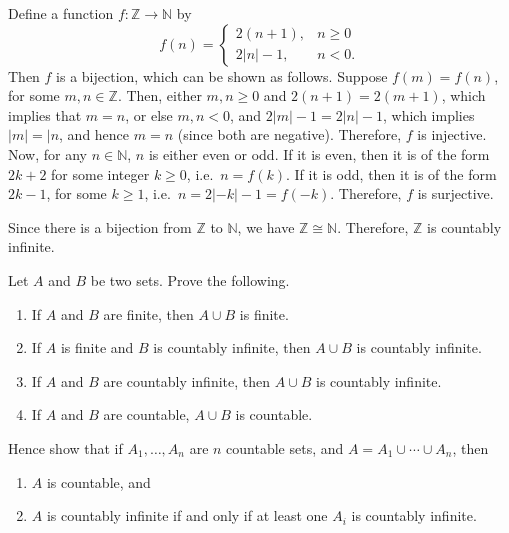 \begin{Solution*}
Define a function $f \colon \mathbb Z \to \mathbb N$ by
\begin{equation*}
f(n) = \begin{cases}
2(n + 1), & n \ge 0 \\
2|n| - 1, & n < 0.
\end{cases}
\end{equation*}
Then $f$ is a bijection, which can be shown as follows. Suppose $f(m) = f(n)$, for some $m, n \in \mathbb Z$. Then, either $m, n \ge 0$ and $2(n + 1) = 2(m + 1)$, which implies that $m = n$, or else $m, n < 0$, and $2|m| - 1 = 2|n| - 1$, which implies $|m| = |n$, and hence $m = n$ (since both are negative). Therefore, $f$ is injective. Now, for any $n \in \mathbb N$, $n$ is either even or odd. If it is even, then it is of the form $2k + 2$ for some integer $k \ge 0$, i.e.\ $n = f(k)$. If it is odd, then it is of the form $2k - 1$, for some $k \ge 1$, i.e.\ $n = 2|-k| - 1 = f(-k)$. Therefore, $f$ is surjective.

Since there is a bijection from $\mathbb Z$ to $\mathbb N$, we have $\mathbb Z \cong \mathbb N$. Therefore, $\mathbb Z$ is countably infinite.
\end{Solution*}

\begin{Exercise}
Let $A$ and $B$ be two sets. Prove the following.
\begin{enumerate}
\item If $A$ and $B$ are finite, then $A \cup B$ is finite.
\item If $A$ is finite and $B$ is countably infinite, then $A \cup B$ is countably infinite.
\item If $A$ and $B$ are countably infinite, then $A \cup B$ is countably infinite.
\item If $A$ and $B$ are countable, $A \cup B$ is countable.
\end{enumerate}
Hence show that if $A_1, \ldots, A_n$ are $n$ countable sets, and $A = A_1 \cup \cdots \cup A_n$, then
\begin{enumerate}
\item $A$ is countable, and
\item $A$ is countably infinite if and only if at least one $A_i$ is countably infinite.
\end{enumerate}
\end{Exercise}


